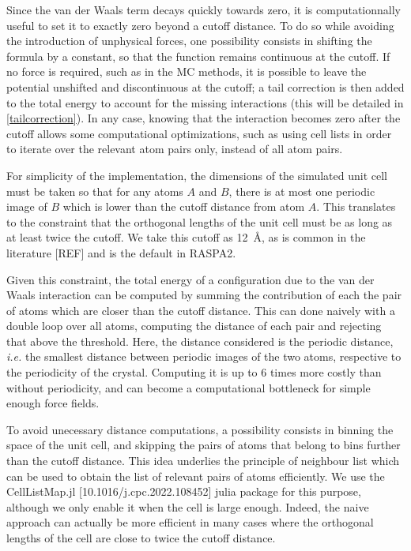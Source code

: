 \documentclass[main.tex]{subfiles}
\begin{document}
Since the van der Waals term decays quickly towards zero, it is computationnally useful to set it to exactly zero beyond a cutoff distance. To do so while avoiding the introduction of unphysical forces, one possibility consists in shifting the formula by a constant, so that the function remains continuous at the cutoff. If no force is required, such as in the MC methods, it is possible to leave the potential unshifted and discontinuous at the cutoff; a tail correction is then added to the total energy to account for the missing interactions (this will be detailed in \cref{tailcorrection}). In any case, knowing that the interaction becomes zero after the cutoff allows some computational optimizations, such as using cell lists in order to iterate over the relevant atom pairs only, instead of all atom pairs.

For simplicity of the implementation, the dimensions of the simulated unit cell must be taken so that for any atoms $A$ and $B$, there is at most one periodic image of $B$ which is lower than the cutoff distance from atom $A$. This translates to the constraint that the orthogonal lengths of the unit cell must be as long as at least twice the cutoff. We take this cutoff as \qty{12}{\angstrom}, as is common in the literature [REF] and is the default in RASPA2.

Given this constraint, the total energy of a configuration due to the van der Waals interaction can be computed by summing the contribution of each the pair of atoms which are closer than the cutoff distance. This can done naively with a double loop over all atoms, computing the distance of each pair and rejecting that above the threshold. Here, the distance considered is the periodic distance, \textit{i.e.} the smallest distance between periodic images of the two atoms, respective to the periodicity of the crystal. Computing it is up to 6 times more costly than without periodicity, and can become a computational bottleneck for simple enough force fields.

To avoid unecessary distance computations, a possibility consists in binning the space of the unit cell, and skipping the pairs of atoms that belong to bins further than the cutoff distance. This idea underlies the principle of neighbour list which can be used to obtain the list of relevant pairs of atoms efficiently. We use the CellListMap.jl [10.1016/j.cpc.2022.108452] julia package for this purpose, although we only enable it when the cell is large enough. Indeed, the naive approach can actually be more efficient in many cases where the orthogonal lengths of the cell are close to twice the cutoff distance.
\end{document}
